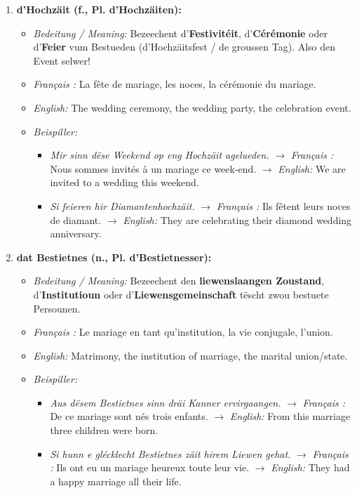 \begin{enumerate}
    \item \textbf{d'Hochzäit (f., Pl. d'Hochzäiten):}
    \begin{itemize}
        \item \textit{Bedeitung / Meaning:} Bezeechent d'\textbf{Festivitéit}, d'\textbf{Cérémonie} oder d'\textbf{Feier} vum Bestueden (d'Hochzäitsfest / de groussen Tag). Also den Event selwer!
        \item \textit{Français :} La fête de mariage, les noces, la cérémonie du mariage.
        \item \textit{English:} The wedding ceremony, the wedding party, the celebration event.
        \item \textit{Beispiller:}
        \begin{itemize}
            \item \textit{Mir sinn dëse Weekend op eng Hochzäit agelueden.}
            $\rightarrow$ \textit{Français :} Nous sommes invités à un mariage ce week-end.
            $\rightarrow$ \textit{English:} We are invited to a wedding this weekend.

            \item \textit{Si feieren hir Diamantenhochzäit.}
            $\rightarrow$ \textit{Français :} Ils fêtent leurs noces de diamant.
            $\rightarrow$ \textit{English:} They are celebrating their diamond wedding anniversary.
        \end{itemize}
    \end{itemize}

    \vspace{0.8em}

    \item \textbf{dat Bestietnes (n., Pl. d'Bestietnesser):}
    \begin{itemize}
        \item \textit{Bedeitung / Meaning:} Bezeechent den \textbf{liewenslaangen Zoustand}, d'\textbf{Institutioun} oder d'\textbf{Liewensgemeinschaft} tëscht zwou bestuete Persounen.
        \item \textit{Français :} Le mariage en tant qu'institution, la vie conjugale, l'union.
        \item \textit{English:} Matrimony, the institution of marriage, the marital union/state.
        \item \textit{Beispiller:}
        \begin{itemize}
            \item \textit{Aus dësem Bestietnes sinn dräi Kanner ervirgaangen.}
            $\rightarrow$ \textit{Français :} De ce mariage sont nés trois enfants.
            $\rightarrow$ \textit{English:} From this marriage three children were born.

            \item \textit{Si hunn e glécklecht Bestietnes zäit hirem Liewen gehat.}
            $\rightarrow$ \textit{Français :} Ils ont eu un mariage heureux toute leur vie.
            $\rightarrow$ \textit{English:} They had a happy marriage all their life.
        \end{itemize}
    \end{itemize}
\end{enumerate}

